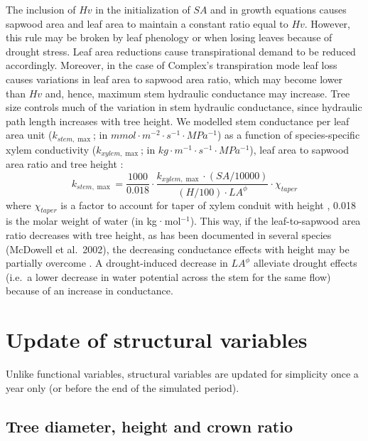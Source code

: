 \documentclass[]{book}
\begin{document}
The inclusion of \(Hv\) in the initialization of \(SA\) and in growth equations causes sapwood area and leaf area to maintain a constant ratio equal to \(Hv\). However, this rule may be broken by leaf phenology or when losing leaves because of drought stress. Leaf area reductions cause transpirational demand to be reduced accordingly. Moreover, in the case of Complex's transpiration mode leaf loss causes variations in leaf area to sapwood area ratio, which may become lower than \(Hv\) and, hence, maximum stem hydraulic conductance may increase. Tree size controls much of the variation in stem hydraulic conductance, since hydraulic path length increases with tree height. We modelled stem conductance per leaf area unit (\(k_{stem, \max}\); in \(mmol·m^{-2}·s^{-1}·MPa^{-1}\)) as a function of species-specific xylem conductivity (\(k_{xylem, \max}\); in \(kg·m^{-1}·s^{-1}·MPa^{-1}\)), leaf area to sapwood area ratio and tree height \citep{Christoffersen2016}:
\begin{equation}
k_{stem, \max} = \frac{1000}{0.018} \cdot \frac{k_{xylem, \max} \cdot (SA/10000)}{(H/100) \cdot LA^{\phi}} \cdot \chi_{taper}
\end{equation}
where \(\chi_{taper}\) is a factor to account for taper of xylem conduit with height \citep{Savage2010, Christoffersen2016}, 0.018 is the molar weight of water (in kg·mol\(^{-1}\)). This way, if the leaf-to-sapwood area ratio decreases with tree height, as has been documented in several species (McDowell et al.~2002), the decreasing conductance effects with height may be partially overcome \citep{Christoffersen2016}. A drought-induced decrease in \(LA^{\phi}\) alleviate drought effects (i.e.~a lower decrease in water potential across the stem for the same flow) because of an increase in conductance.

\hypertarget{update-of-structural-variables}{%
\chapter{Update of structural variables}\label{update-of-structural-variables}}

Unlike functional variables, structural variables are updated for simplicity once a year only (or before the end of the simulated period).

\hypertarget{tree-diameter-height-and-crown-ratio}{%
\section{Tree diameter, height and crown ratio}\label{tree-diameter-height-and-crown-ratio}}
\end{document}

